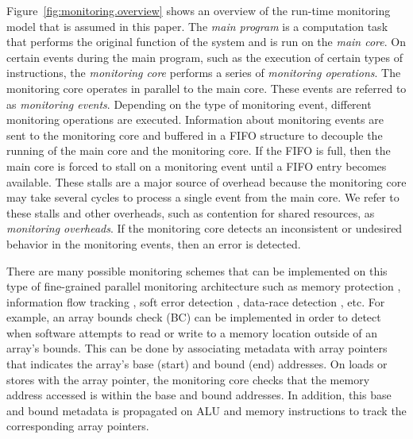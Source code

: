 Figure~\ref{fig:monitoring.overview} shows an overview of the run-time monitoring
model that is assumed in this paper.  The \emph{main program} is a computation
task that performs the original function of the system and is run on the
\emph{main core}.  On certain events during the main program, such as the
execution of certain types of instructions, the \emph{monitoring core} performs a
series of \emph{monitoring operations}. The monitoring core operates in parallel to the
main core. These events are referred to as \emph{monitoring events}. Depending
on the type of monitoring event, different monitoring operations are
executed. Information about monitoring events are sent to the monitoring core and buffered in a FIFO structure to decouple the
running of the main core and the monitoring core. If the FIFO is full, then the main
core is forced to stall on a monitoring event until a FIFO entry becomes
available. These stalls are a major source of
overhead because the monitoring core may take several cycles to process a single event
from the main core. We refer to these stalls and other overheads, such as
contention for shared resources, as \emph{monitoring overheads}. If the monitoring core
detects an inconsistent or undesired behavior in the monitoring events, then
an error is detected. 

There are many possible monitoring schemes that can be implemented on this type
of fine-grained parallel monitoring architecture such as memory protection
\cite{mondrian-asplos02}, information flow tracking \cite{dift-asplos04,
testudo-micro08}, soft error detection \cite{argus-micro07}, data-race
detection \cite{cord-hpca06}, etc.  For example, an array bounds check (BC)
\cite{hardbound-asplos08} can be implemented in order to detect
when software attempts to read or write to a memory location outside of an
array's bounds. This can be done by associating metadata with array pointers that 
indicates the array's base (start) and bound (end) addresses. On loads or stores with the
array
pointer, the monitoring core checks that the memory address accessed is within the base and
bound addresses. In addition, this base and bound metadata
is propagated on ALU and memory instructions to track the corresponding array pointers.

